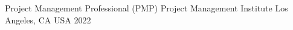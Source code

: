 

\begin{cventries}


   \cventry
    {Project Management Professional (PMP) } %
    {Project Management Institute} %
    {Los Angeles, CA USA} %
    {2022} %
    {}
 

\end{cventries}
